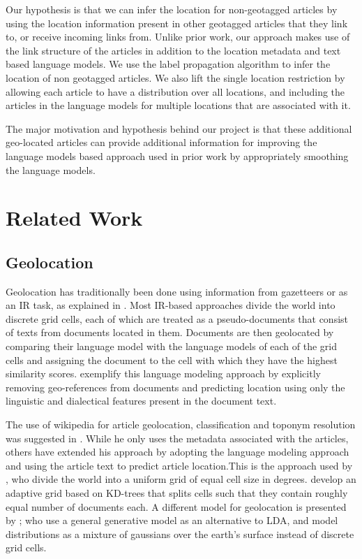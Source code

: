 \documentclass[11pt]{article}
\newcommand{\comment}[1]{}
\begin{document}
Our hypothesis is that we can infer the location for non-geotagged articles by using the location information present in other geotagged articles that they link to, or receive incoming links from. 
Unlike prior work, our approach makes use of the link structure of the articles in addition to the location metadata and text based language models. 
We use the label propagation algorithm \cite{} to infer the location of non geotagged articles. We also lift the single location restriction by allowing each article 
to have a distribution over all locations, and including the articles in the language models for multiple locations that are associated with it.

The major motivation and hypothesis behind our project is that these additional geo-located articles can provide additional information for improving the language models based approach 
used in prior work by appropriately smoothing the language models.



\section{Related Work}
\subsection{Geolocation}
Geolocation has traditionally been done \comment{improve this part} using information from gazetteers \cite{} or as an IR task, as explained in \cite{skiles:12}. 
Most IR-based approaches divide the world into discrete grid cells, each of which are treated as a pseudo-documents that consist of texts from documents located in them.
Documents are then geolocated by comparing their language model with the language models of each of the grid cells and assigning the document to the cell with which 
they have the highest similarity scores. \cite{eisenstein sociaologaige} exemplify this language modeling approach by explicitly removing geo-references from documents 
and predicting location using only the linguistic and dialectical features present in the document text.

The use of wikipedia for article geolocation, classification and toponym resolution was suggested in \cite{Overall09}. 
While he only uses the metadata associated with the articles, others have extended his approach by adopting the language modeling approach and 
using the article text to predict article location.This is the approach used by \cite{wing-baldridge:11}, who divide the world into a uniform grid of equal cell size in degrees.
\cite{rolleretal:12} develop an adaptive grid based on KD-trees that splits cells such that they contain roughly equal number of documents each.
A different model for geolocation is presented by \cite{eisensteinetal:11}; who use a general generative model as an alternative to LDA, and model distributions 
as a mixture of gaussians over the earth's surface instead of discrete grid cells. 
\end{document}
